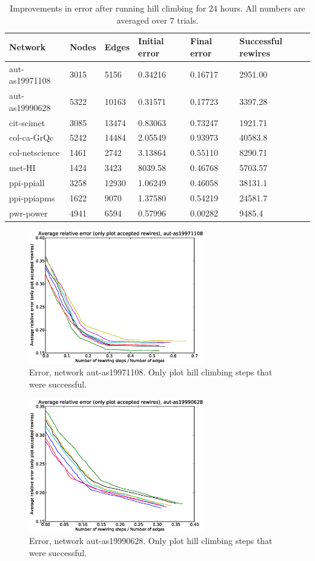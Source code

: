 \begin{table}[t]
\centering
\begin{tabular}{| l | l | l | | l | l | l |}
\hline
Network & Nodes & Edges & Initial error & Final error & Successful rewires\\ \hline
aut-as19971108 & 3015 & 5156 & 0.34216 & 0.16717 & 2951.00\\\hline
aut-as19990628 & 5322 & 10163 & 0.31571 & 0.17723 & 3397.28\\\hline
cit-scimet & 3085 & 13474 & 0.83063 & 0.73247 & 1921.71\\\hline
col-ca-GrQc & 5242 & 14484 & 2.05549 & 0.93973 & 40583.8\\\hline
col-netscience & 1461 & 2742 & 3.13864 & 0.55110 & 8290.71\\\hline
met-HI & 1424 & 3423 & 8039.58 & 0.46768 & 5703.57\\\hline
ppi-ppiall & 3258 & 12930 & 1.06249 & 0.46058 & 38131.1\\\hline
ppi-ppiapms & 1622 & 9070 & 1.37580 & 0.54219 & 24581.7\\\hline
pwr-power & 4941 & 6594 & 0.57996 & 0.00282 & 9485.4\\\hline
\end{tabular}
\caption{Improvements in error after running hill climbing for 24 hours.  All numbers are averaged over $7$ trials.}
\label{table:errors}
\end{table}

\begin{figure}[p]
\centering
\includegraphics[width=3in]{Figures/acceptedOnly-aut-as19971108.eps}
\caption{Error, network aut-as19971108.  Only plot hill climbing steps that were successful.}
\label{fig:errors-aut-as19971108}
\end{figure}

\begin{figure}[p]
\centering
\includegraphics[width=3in]{Figures/acceptedOnly-aut-as19990628.eps}
\caption{Error, network aut-as19990628.  Only plot hill climbing steps that were successful.}
\label{fig:errors-aut-as19990628}
\end{figure}

